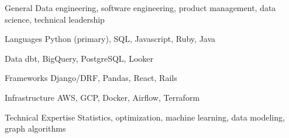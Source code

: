 

\begin{cvskills}
  \cvskill
    {General}
    {Data engineering, software engineering, product management, data science, technical leadership}

  \cvskill
    {Languages}
    {Python (primary), SQL, Javascript, Ruby, Java}

  \cvskill
    {Data}
    {dbt, BigQuery, PostgreSQL, Looker}

  \cvskill
    {Frameworks}
    {Django/DRF, Pandas, React, Rails}

  \cvskill
    {Infrastructure}
    {AWS, GCP, Docker, Airflow, Terraform}

  \cvskill
    {Technical Expertise}
    {Statistics, optimization, machine learning, data modeling, graph algorithms}
\end{cvskills}
